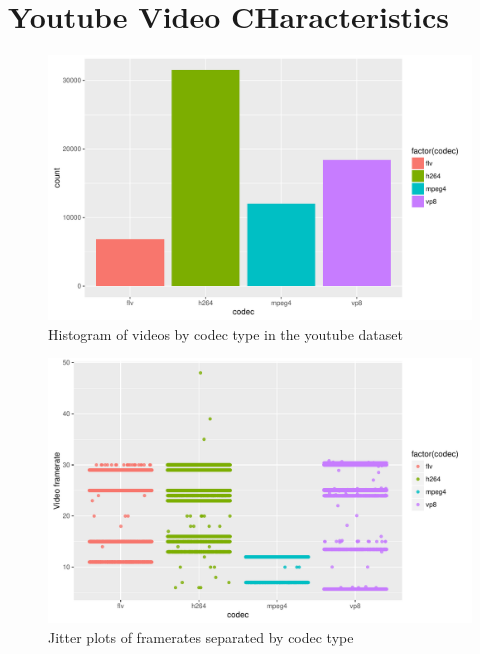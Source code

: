 \documentclass[letterpaper,12pt,titlepage,oneside,final]{report}
\begin{document}
    \section {Youtube Video CHaracteristics}
        \label{app:ytvideo}
        \begin{figure}[!h]
            \centering
            \includegraphics[width=\textwidth]{codec_hist}
            \caption{Histogram of videos by codec type in the youtube dataset}
            \label{codec_hist}
        \end{figure}
        \begin{figure}[!h]
            \centering
            \includegraphics[width=\textwidth]{framerate_hist}
            \caption{Jitter plots of framerates separated by codec type}
            \label{framerate_hist}
        \end{figure}
\end{document}
